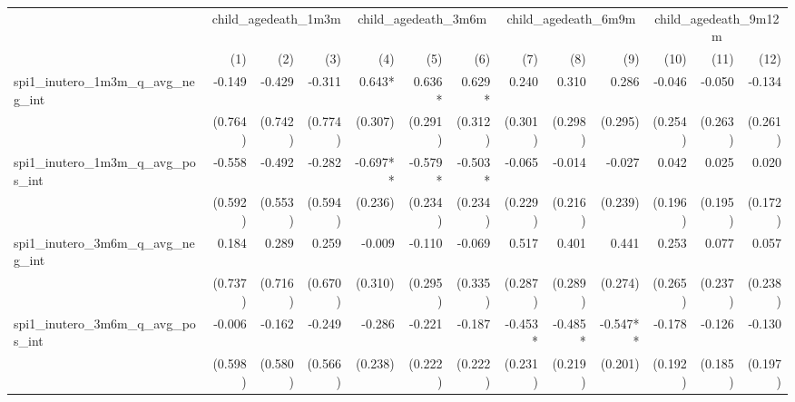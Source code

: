 \begin{tabular}{lrrrrrrrrrrrr}
\toprule
                                            &  \multicolumn{3}{c}{child\_agedeath\_1m3m} &  \multicolumn{3}{c}{child\_agedeath\_3m6m} &  \multicolumn{3}{c}{child\_agedeath\_6m9m} & \multicolumn{3}{c}{child\_agedeath\_9m12m} \\ 
\cmidrule(lr){2-4} \cmidrule(lr){5-7} \cmidrule(lr){8-10} \cmidrule(lr){11-13} 
                                            &          (1) &          (2) &          (3) &          (4) &          (5) &          (6) &          (7) &          (8) &          (9) &         (10) &         (11) &         (12) \\ 
\midrule
spi1\_inutero\_1m3m\_q\_avg\_neg\_int       &       -0.149 &       -0.429 &       -0.311 &       0.643* &       0.636* &       0.629* &        0.240 &        0.310 &        0.286 &       -0.046 &       -0.050 &       -0.134 \\ 
                                            &      (0.764) &      (0.742) &      (0.774) &      (0.307) &      (0.291) &      (0.312) &      (0.301) &      (0.298) &      (0.295) &      (0.254) &      (0.263) &      (0.261) \\ 
spi1\_inutero\_1m3m\_q\_avg\_pos\_int       &       -0.558 &       -0.492 &       -0.282 &     -0.697** &      -0.579* &      -0.503* &       -0.065 &       -0.014 &       -0.027 &        0.042 &        0.025 &        0.020 \\ 
                                            &      (0.592) &      (0.553) &      (0.594) &      (0.236) &      (0.234) &      (0.234) &      (0.229) &      (0.216) &      (0.239) &      (0.196) &      (0.195) &      (0.172) \\ 
spi1\_inutero\_3m6m\_q\_avg\_neg\_int       &        0.184 &        0.289 &        0.259 &       -0.009 &       -0.110 &       -0.069 &        0.517 &        0.401 &        0.441 &        0.253 &        0.077 &        0.057 \\ 
                                            &      (0.737) &      (0.716) &      (0.670) &      (0.310) &      (0.295) &      (0.335) &      (0.287) &      (0.289) &      (0.274) &      (0.265) &      (0.237) &      (0.238) \\ 
spi1\_inutero\_3m6m\_q\_avg\_pos\_int       &       -0.006 &       -0.162 &       -0.249 &       -0.286 &       -0.221 &       -0.187 &      -0.453* &      -0.485* &     -0.547** &       -0.178 &       -0.126 &       -0.130 \\ 
                                            &      (0.598) &      (0.580) &      (0.566) &      (0.238) &      (0.222) &      (0.222) &      (0.231) &      (0.219) &      (0.201) &      (0.192) &      (0.185) &      (0.197) \\ 

\end{tabular}
